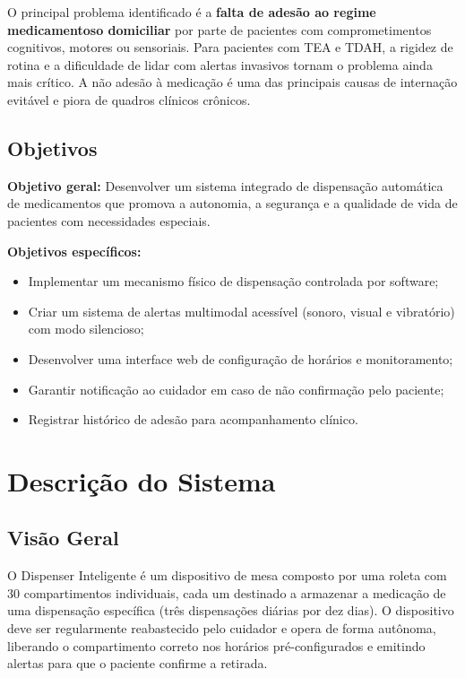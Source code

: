 \documentclass[12pt,a4paper]{article}
\begin{document}
O principal problema identificado é a \textbf{falta de adesão ao regime medicamentoso domiciliar} por parte de pacientes com comprometimentos cognitivos, motores ou sensoriais. Para pacientes com TEA e TDAH, a rigidez de rotina e a dificuldade de lidar com alertas invasivos tornam o problema ainda mais crítico. A não adesão à medicação é uma das principais causas de internação evitável e piora de quadros clínicos crônicos.

\subsection{Objetivos}

\textbf{Objetivo geral:} Desenvolver um sistema integrado de dispensação automática de medicamentos que promova a autonomia, a segurança e a qualidade de vida de pacientes com necessidades especiais.

\textbf{Objetivos específicos:}
\begin{itemize}
    \item Implementar um mecanismo físico de dispensação controlada por software;
    \item Criar um sistema de alertas multimodal acessível (sonoro, visual e vibratório) com modo silencioso;
    \item Desenvolver uma interface web de configuração de horários e monitoramento;
    \item Garantir notificação ao cuidador em caso de não confirmação pelo paciente;
    \item Registrar histórico de adesão para acompanhamento clínico.
\end{itemize}

\newpage

\section{Descrição do Sistema}

\subsection{Visão Geral}

O Dispenser Inteligente é um dispositivo de mesa composto por uma roleta com 30 compartimentos individuais, cada um destinado a armazenar a medicação de uma dispensação específica (três dispensações diárias por dez dias). O dispositivo deve ser regularmente reabastecido pelo cuidador e opera de forma autônoma, liberando o compartimento correto nos horários pré-configurados e emitindo alertas para que o paciente confirme a retirada.
\end{document}

